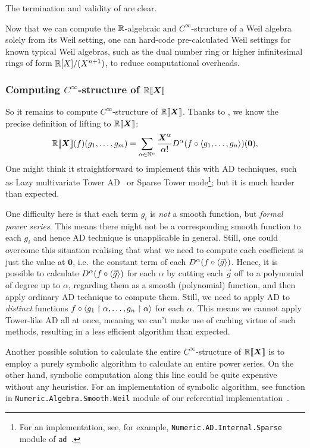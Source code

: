 \documentclass[%
  sigconf,authorversion,screen]{acmart}
\begin{document}
The termination and validity of  are clear.

Now that we can compute the $\mathbb{R}$-algebraic and $C^\infty$-structure of a Weil algebra solely from its Weil setting, one can hard-code pre-calculated Weil settings for known typical Weil algebras, such as the dual number ring or higher infinitesimal rings of form $\mathbb{R}[X]/(X^{n+1})$, to reduce computational overheads.

\subsubsection{Computing $C^\infty$-structure of $\mathord{\mathbb{R}\llbracket\boldsymbol{X}\rrbracket}$}\label{sec:power-series-lifting}
So it remains to compute $C^\infty$-structure of $\mathord{\mathbb{R}\llbracket\boldsymbol{X}\rrbracket}$.
Thanks to , we know the precise definition of lifting to $\mathord{\mathbb{R}\llbracket\boldsymbol{X}\rrbracket}$:
\[
  \mathord{\mathbb{R}\llbracket\boldsymbol{X}\rrbracket}(f)(g_1, \dots, g_m) = \sum_{\alpha \in \mathbb{N}^n} \frac{\boldsymbol{X}^\alpha}{\alpha!} D^\alpha(f \circ \braket{g_1, \dots, g_n})(\boldsymbol{0}),
\]
One might think it straightforward to implement this with AD techniques, such as Lazy multivariate Tower AD~\cite{Pearlmutter:2007aa} or Sparse Tower mode\footnote{For an implementation, see, for example, \texttt{Numeric.AD.Internal.Sparse} module of \texttt{ad}~\cite{Kmett:2010aa}.}; but it is much harder than expected.

One difficulty here is that each term $g_i$ is \emph{not} a smooth function, but \emph{formal power series}.
This means there might not be a corresponding smooth function to each $g_i$ and hence AD technique is unapplicable in general.
Still, one could overcome this situation realising that what we need to compute each coefficient is just the value at $\boldsymbol{0}$, i.e.\ the constant term of each $D^\alpha(f\circ\braket{\vec{g}})$.
Hence, it is possible to calculate $D^\alpha(f\circ\braket{\vec{g}})$ for each $\alpha$ by cutting each $\vec{g}$ off to a polynomial of degree up to $\alpha$, regarding them as a smooth (polynomial) function, and then apply ordinary AD technique to compute them.
Still, we need to apply AD to \emph{distinct} functions $f \circ \braket{g_1 \upharpoonright \alpha, \dots, g_n \upharpoonright \alpha}$ for each $\alpha$.
This means we cannot apply Tower-like AD all at once, meaning we can't make use of caching virtue of such methods, resulting in a less efficient algorithm than expected.

Another possible solution to calculate the entire $C^\infty$-structure of $\mathord{\mathbb{R}\llbracket\boldsymbol{X}\rrbracket}$ is to employ a purely symbolic algorithm to calculate an entire power series.
On the other hand, symbolic computation along this line could be quite expensive without any heuristics.
For an implementation of symbolic algorithm, see  function in \texttt{Numeric.Algebra.Smooth.Weil} module of our referential implementation~\cite{Ishii:2020aa}.
\end{document}
